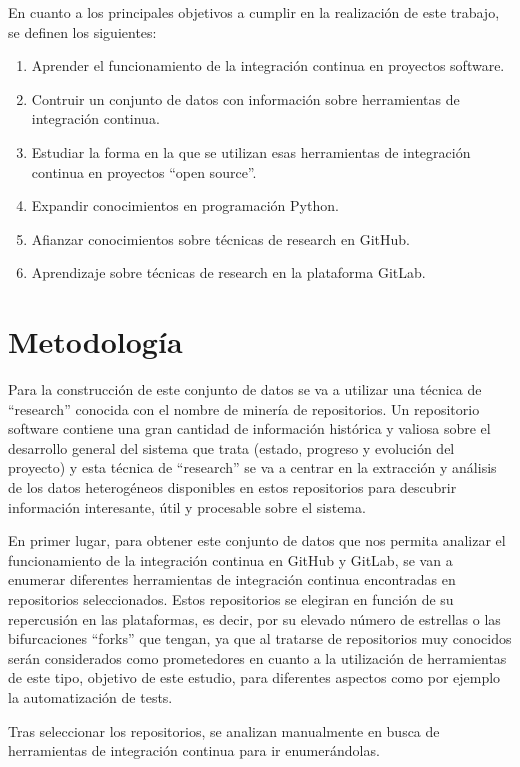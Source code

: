 En cuanto a los principales objetivos a cumplir en la realización de este trabajo, se definen los siguientes:
\begin{enumerate}
    \item Aprender el funcionamiento de la integración continua en proyectos software.
    \item Contruir un conjunto de datos con información sobre herramientas de integración continua.
    \item Estudiar la forma en la que se utilizan esas herramientas de integración continua en proyectos ``open source''.
    \item Expandir conocimientos en programación Python.
    \item Afianzar conocimientos sobre técnicas de research en GitHub.
    \item Aprendizaje sobre técnicas de research en la plataforma GitLab.
\end{enumerate}

\section{Metodología}

Para la construcción de este conjunto de datos se va a utilizar una técnica de ``research'' conocida con el nombre de minería de repositorios.
Un repositorio software contiene una gran cantidad de información histórica y valiosa sobre el desarrollo general del sistema que trata (estado, progreso y evolución del proyecto) y esta técnica de ``research'' se va a centrar en la extracción y análisis de los datos heterogéneos disponibles en estos repositorios para descubrir información interesante, útil y procesable sobre el sistema.

En primer lugar, para obtener este conjunto de datos que nos permita analizar el funcionamiento de la integración continua en GitHub y GitLab, se van a enumerar diferentes herramientas de integración continua encontradas en repositorios seleccionados. 
Estos repositorios se elegiran en función de su repercusión en las plataformas, es decir, por su elevado número de estrellas o las bifurcaciones ``forks'' que tengan, ya que al tratarse de repositorios muy conocidos serán considerados como prometedores en cuanto a la utilización de herramientas de este tipo, objetivo de este estudio, para diferentes aspectos como por ejemplo la automatización de tests.

Tras seleccionar los repositorios, se analizan manualmente en busca de herramientas de integración continua para ir enumerándolas.

